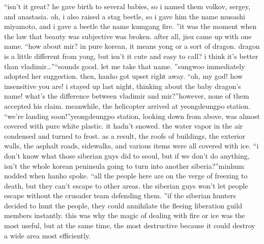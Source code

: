 “isn’t it great? he gave birth to several babies, so i named them volkov, sergey, and anastasia.
 oh, i also raised a stag beetle, so i gave him the name musashi miyamoto, and i gave a beetle the name kumgang fire.
”it was the moment when the law that beauty was subjective was broken.
after all, jisu came up with one name.
“how about mir? in pure korean, it means yong or a sort of dragon.
 dragon is a little different from yong, but isn’t it cute and easy to call? i think it’s better than vladimir…”“sounds good.
 let me take that name.
”sungwoo immediately adopted her suggestion.
 then, hanho got upset right away.
“oh, my god! how insensitive you are! i stayed up last night, thinking about the baby dragon’s name! what’s the difference between vladimir and mir?”however, none of them accepted his claim.
meanwhile, the helicopter arrived at yeongdeungpo station.
“we’re landing soon!”yeongdeungpo station, looking down from above, was almost covered with pure white plastic.
it hadn’t snowed.
 the water vapor in the air condensed and turned to frost.
 as a result, the roofs of buildings, the exterior walls, the asphalt roads, sidewalks, and various items were all covered with ice.
“i don’t know what those siberian guys did to seoul, but if we don’t do anything, isn’t the whole korean peninsula going to turn into another siberia?”minhum nodded when hanho spoke.
“all the people here are on the verge of freezing to death, but they can’t escape to other areas.
 the siberian guys won’t let people escape without the crusader team defending them.
”if the siberian hunters decided to hunt the people, they could annihilate the fleeing liberation guild members instantly.
this was why the magic of dealing with fire or ice was the most useful, but at the same time, the most destructive because it could destroy a wide area most efficiently.

